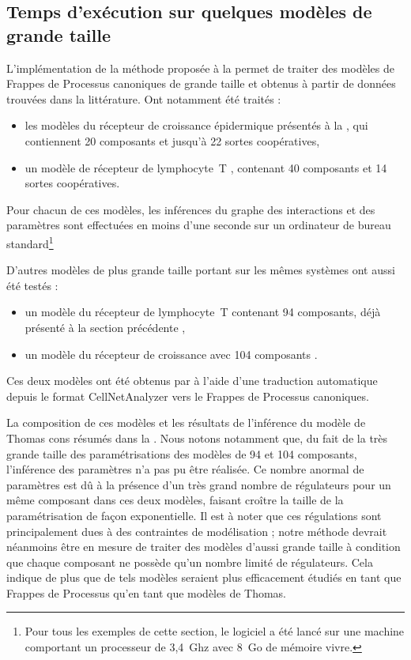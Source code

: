 \subsection{Temps d'exécution sur quelques modèles de grande taille}

L'implémentation de la méthode proposée à la  permet de traiter
des modèles de
Frappes de Processus canoniques de grande taille et obtenus à partir de données
trouvées dans la littérature.
Ont notamment été traités :
\begin{itemize}
  \item les modèles du récepteur de croissance épidermique présentés
    à la  \cite{Sahin09},
    qui contiennent 20 composants et jusqu'à 22 sortes coopératives,
  \item un modèle de récepteur de lymphocyte~T \cite{Klamt06},
    contenant 40 composants et 14 sortes coopératives.
\end{itemize}
Pour chacun de ces modèles, les inférences du graphe des interactions et des paramètres
sont effectuées en moins d'une seconde sur un ordinateur de bureau
standard\footnote{Pour tous les exemples de cette section,
le logiciel a été lancé sur une machine comportant
un processeur de 3,4~Ghz avec 8~Go de mémoire vivre.}

D'autres modèles de plus grande taille portant sur les mêmes systèmes ont aussi été testés :
\begin{itemize}
  \item un modèle du récepteur de lymphocyte~T contenant 94 composants,
    déjà présenté à la section précédente \cite{SaezRodriguez2007},
  \item un modèle du récepteur de croissance avec 104 composants \cite{Samaga2009}.
\end{itemize}
Ces deux modèles ont été obtenus par  à l'aide d'une traduction
automatique depuis le format CellNetAnalyzer \cite{klamt2007structural}
vers le Frappes de Processus canoniques.

La composition de ces modèles et les résultats de l'inférence du modèle de Thomas
cons résumés dans la .
Nous notons notamment que, du fait de la très grande taille des paramétrisations
des modèles de 94 et 104 composants, l'inférence des paramètres n'a pas pu être réalisée.
Ce nombre anormal de paramètres est dû à la présence d'un très grand nombre de régulateurs
pour un même composant dans ces deux modèles, faisant croître la taille de la paramétrisation
de façon exponentielle.
Il est à noter que ces régulations sont principalement dues à des contraintes de modélisation ;
notre méthode devrait néanmoins être en mesure de traiter des modèles d'aussi grande taille
à condition que chaque composant ne possède qu'un nombre limité de régulateurs.
Cela indique de plus que de tels modèles seraient plus efficacement étudiés
en tant que Frappes de Processus qu'en tant que modèles de Thomas.

